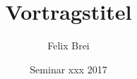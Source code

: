 \usepackage[utf8]{inputenc}
\usepackage[ngerman]{babel}


\title{Vortragstitel}
\author{Felix Brei}
\date{Seminar xxx 2017}
